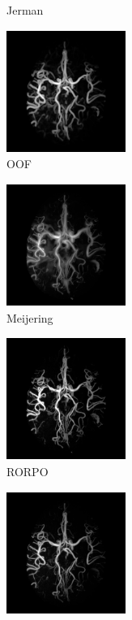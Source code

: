 \begin{figure}[!ht]
\begin{subfigure}[t]{0.32\textwidth}
  \caption{Jerman}
  \end{subfigure}
  \begin{subfigure}[t]{0.32\textwidth}
  \includegraphics[clip = true, trim = 90 20 90 20, height=4cm,width=3.9cm]{Images/Bullitt_OOF_GM.png}
  \caption{OOF}
  \end{subfigure}
  \begin{subfigure}[t]{0.32\textwidth}
  \includegraphics[clip = true, trim = 90 20 90 20, height=4cm,width=3.9cm]{Images/Bullitt_Meijering.png}
  \caption{Meijering}
  \end{subfigure}
  \begin{subfigure}[t]{0.32\textwidth}
  \includegraphics[clip = true, trim = 90 20 90 20, height=4cm,width=3.9cm]{Images/Bullitt_RORPO.png}
  \caption{RORPO}
  \end{subfigure}
  \begin{subfigure}[t]{0.32\textwidth}
  \includegraphics[clip = true, trim = 90 20 90 20, height=4cm,width=3.9cm]{Images/Bullitt_Sato.png}

\end{subfigure}
\end{figure}
